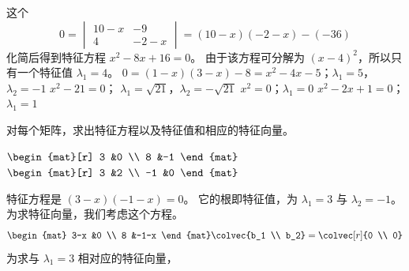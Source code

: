 \begin{exercises}
\begin{answer}
      \begin{exparts}
         \partsitem 这个
           \begin{equation*}
             0=
             \begin{vmatrix}
               10-x  &-9  \\
               4     &-2-x
             \end{vmatrix}
             =(10-x)(-2-x)-(-36)
           \end{equation*}
           化简后得到特征方程 \( x^2-8x+16=0 \)。 
           由于该方程可分解为 $(x-4)^2$，所以只有一个特征值
           \( \lambda_1=4 \)。
         \partsitem $0=(1-x)(3-x)-8=x^2-4x-5$；$\lambda_1=5$，$\lambda_2=-1$
         \partsitem \( x^2-21=0 \)； 
           \( \lambda_1=\sqrt{21} \)，$\lambda_2=-\sqrt{21}$
         \partsitem \( x^2=0 \)；\( \lambda_1=0 \)
         \partsitem \( x^2-2x+1=0 \)；\( \lambda_1=1 \)
       \end{exparts}  
     \end{answer}
  \recommended \item
    对每个矩阵，求出特征方程以及特征值和相应的特征向量。
    \begin{exparts*}
      \partsitem \( \begin{mat}[r]
                  3  &0  \\
                  8  &-1
            \end{mat}  \)
      \partsitem \( \begin{mat}[r]
                  3  &2  \\
                 -1  &0
            \end{mat}  \)
    \end{exparts*}
    \begin{answer}
       \begin{exparts}
         \partsitem 特征方程是 \( (3-x)(-1-x)=0 \)。
           它的根即特征值，为 \( \lambda_1=3 \) 与 
           \( \lambda_2=-1 \)。
           为求特征向量，我们考虑这个方程。
           \begin{equation*}
             \begin{mat}
               3-x  &0    \\
               8    &-1-x
             \end{mat}
             \colvec{b_1  \\  b_2}
             =\colvec[r]{0  \\  0}
           \end{equation*}
           为求与 $\lambda_1=3$ 相对应的特征向量，

\end{exparts}
\end{answer}
\end{exercises}
